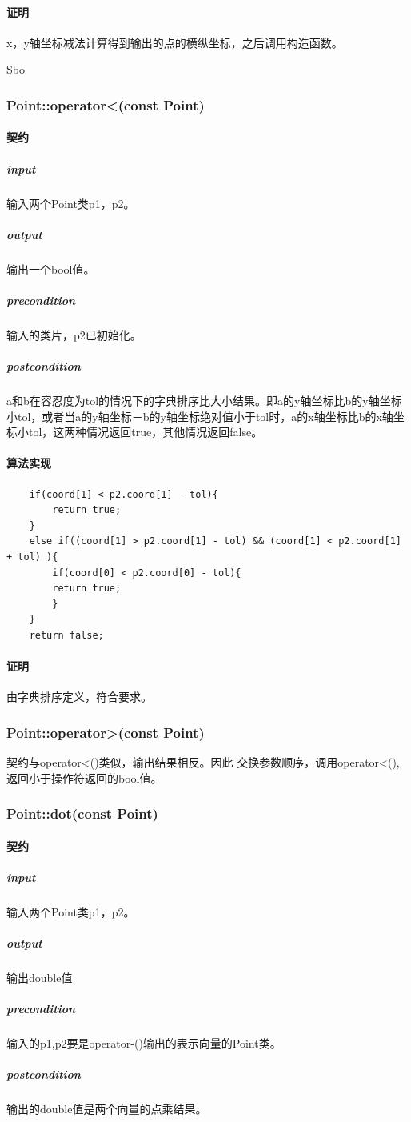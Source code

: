 \documentclass[a4paper]{book}
\numberwithin{equation}{chapter}
\theoremstyle{definition}
\begin{document}
\paragraph{证明}
x，y轴坐标减法计算得到输出的点的横纵坐标，之后调用构造函数。

Sbo\subsubsection{Point::operator<(const Point)}
\paragraph{契约}
\subparagraph{input}
输入两个Point类p1，p2。
\subparagraph{output}
输出一个bool值。
\subparagraph{precondition}
输入的类片，p2已初始化。
\subparagraph{postcondition}
a和b在容忍度为tol的情况下的字典排序比大小结果。即a的y轴坐标比b的y轴坐标小tol，或者当a的y轴坐标－b的y轴坐标绝对值小于tol时，a的x轴坐标比b的x轴坐标小tol，这两种情况返回true，其他情况返回false。
\paragraph{算法实现}
\begin{lstlisting}
	if(coord[1] < p2.coord[1] - tol){
		return true;
	}
	else if((coord[1] > p2.coord[1] - tol) && (coord[1] < p2.coord[1] + tol) ){
		if(coord[0] < p2.coord[0] - tol){
		return true;
		}
	}
	return false;
\end{lstlisting}
\paragraph{证明}
由字典排序定义，符合要求。
\subsubsection{Point::operator>(const Point)}
契约与operator<()类似，输出结果相反。因此
交换参数顺序，调用operator<(),返回小于操作符返回的bool值。

\subsubsection{Point::dot(const Point)}
\paragraph{契约}
\subparagraph{input}
输入两个Point类p1，p2。
\subparagraph{output}
输出double值
\subparagraph{precondition}
输入的p1,p2要是operator-()输出的表示向量的Point类。
\subparagraph{postcondition}
输出的double值是两个向量的点乘结果。
\end{document}
